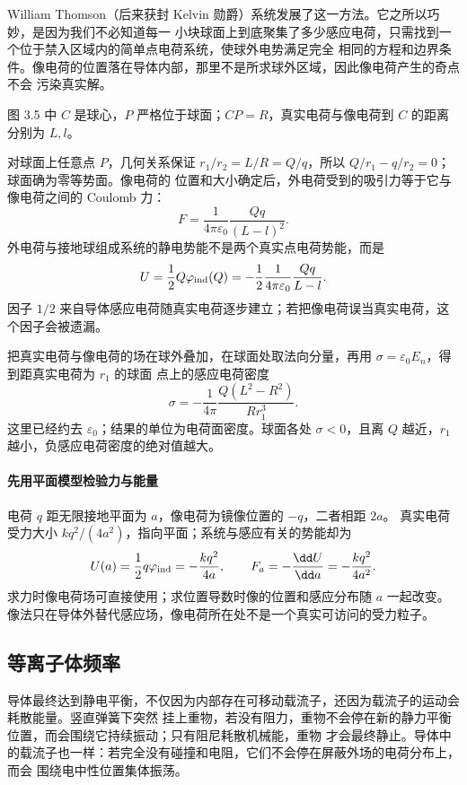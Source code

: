 William Thomson（后来获封 Kelvin 勋爵）系统发展了这一方法。它之所以巧妙，是因为我们不必知道每一
小块球面上到底聚集了多少感应电荷，只需找到一个位于禁入区域内的简单点电荷系统，使球外电势满足完全
相同的方程和边界条件。像电荷的位置落在导体内部，那里不是所求球外区域，因此像电荷产生的奇点不会
污染真实解。

图 3.5 中 $C$ 是球心，$P$ 严格位于球面；$CP=R$，真实电荷与像电荷到 $C$ 的距离分别为 $L,l$。

\groundedSphereImageFigure
{}

对球面上任意点 $P$，几何关系保证
$r_1/r_2=L/R=Q/q$，所以 $Q/r_1-q/r_2=0$；球面确为零等势面。像电荷的
位置和大小确定后，外电荷受到的吸引力等于它与像电荷之间的 Coulomb 力：
\[
  F=\frac{1}{4\pi\varepsilon_0}\frac{Qq}{(L-l)^2}.
\]
外电荷与接地球组成系统的静电势能不是两个真实点电荷势能，而是
\[
  U=\frac12Q\varphi_{\rm ind}(Q)
  =-\frac12\frac{1}{4\pi\varepsilon_0}\frac{Qq}{L-l}.
\]
因子 $1/2$ 来自导体感应电荷随真实电荷逐步建立；若把像电荷误当真实电荷，这个因子会被遗漏。

把真实电荷与像电荷的场在球外叠加，在球面处取法向分量，再用 $\sigma=\varepsilon_0 E_n$，得到距真实电荷为 $r_1$ 的球面
点上的感应电荷密度
\begin{equation}
  \boxed{\sigma=-\frac{1}{4\pi}\frac{Q(L^2-R^2)}{Rr_1^3}}.
\end{equation}
这里已经约去 $\varepsilon_0$；结果的单位为电荷面密度。球面各处 $\sigma<0$，且离 $Q$ 越近，$r_1$
越小，负感应电荷密度的绝对值越大。


\paragraph{先用平面模型检验力与能量}
电荷 $q$ 距无限接地平面为 $a$，像电荷为镜像位置的 $-q$，二者相距 $2a$。
真实电荷受力大小 $kq^2/(4a^2)$，指向平面；系统与感应有关的势能却为
\[
 U(a)=\frac12q\varphi_{\rm ind}=-\frac{kq^2}{4a},\qquad
 F_a=-\frac{\dd U}{\dd a}=-\frac{kq^2}{4a^2}.
\]
求力时像电荷场可直接使用；求位置导数时像的位置和感应分布随 $a$ 一起改变。像法只在导体外替代感应场，像电荷所在处不是一个真实可访问的受力粒子。

\subsection*{等离子体频率}

导体最终达到静电平衡，不仅因为内部存在可移动载流子，还因为载流子的运动会耗散能量。竖直弹簧下突然
挂上重物，若没有阻力，重物不会停在新的静力平衡位置，而会围绕它持续振动；只有阻尼耗散机械能，重物
才会最终静止。导体中的载流子也一样：若完全没有碰撞和电阻，它们不会停在屏蔽外场的电荷分布上，而会
围绕电中性位置集体振荡。

